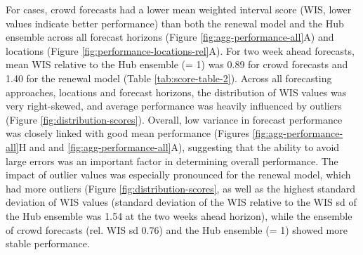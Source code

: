 \documentclass[10pt,letterpaper]{article} %
\providecommand{\DIFaddtex}[1]{{\protect\color{blue}\uwave{#1}}} %
\providecommand{\DIFaddbegin}{} %
\providecommand{\DIFaddend}{} %
\providecommand{\DIFadd}[1]{\texorpdfstring{\DIFaddtex{#1}}{#1}} %
\newcommand{\DIFaddincludegraphics}[2][]{{\color{blue}\fbox{\DIFOincludegraphics[#1]{#2}}}} %
\DeclareRobustCommand{\DIFaddbegin}{\DIFOaddbegin \let\includegraphics\DIFaddincludegraphics} %
\DeclareRobustCommand{\DIFaddend}{\DIFOaddend \let\includegraphics\DIFOincludegraphics} %
\begin{document}
For cases, crowd forecasts had a lower mean weighted interval score
(WIS, lower values indicate better performance) than both the renewal
model and the Hub ensemble across all forecast horizons (Figure
\ref{fig:agg-performance-all}A) and locations (Figure
\ref{fig:performance-locations-rel}A). For two week ahead forecasts,
mean WIS relative to the Hub ensemble (= 1) was 0.89 for crowd forecasts
and 1.40 for the renewal model (Table \ref{tab:score-table-2}). Across
all forecasting approaches, locations and forecast horizons, the
distribution of WIS values was very right-skewed, and average
performance was heavily influenced by outliers (Figure
\ref{fig:distribution-scores}). Overall, low variance in forecast
performance was closely linked with good mean performance (Figures
\ref{fig:agg-performance-all}H and and \ref{fig:agg-performance-all}A),
suggesting that the ability to avoid large errors was an important
factor in determining overall performance. The impact of outlier values
was especially pronounced for the renewal model, which had more outliers
(Figure \ref{fig:distribution-scores}\DIFaddbegin \DIFadd{)}\DIFaddend , as well as the highest standard
deviation of WIS values (standard deviation of the WIS relative to the
WIS sd of the Hub ensemble was 1.54 at the two weeks ahead horizon),
while the ensemble of crowd forecasts (rel. WIS sd 0.76) and the Hub
ensemble (= 1) showed more stable performance.
\end{document}
